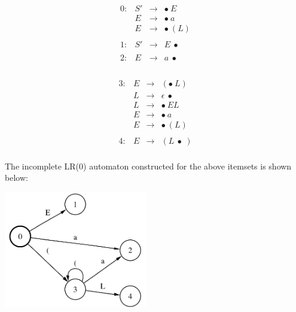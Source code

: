 \documentclass[12pt]{article}
\begin{document}
\begin{exe}
\begin{minipage}[t]{3in}
\[
\begin{array}{llcl}
0: & S' & \rightarrow & \bullet\ E \\
& E & \rightarrow & \bullet\ a \\
& E & \rightarrow & \bullet\ ( L ) \\
&&& \\
1: & S' & \rightarrow & E\ \bullet \\
&&& \\
2: & E & \rightarrow & a\ \bullet \\
&&& \\
\end{array}
\]
\end{minipage}
\begin{minipage}[t]{3in}
\[
\begin{array}{llcl}
3: & E & \rightarrow & ( \bullet\ L ) \\
& L  & \rightarrow & \epsilon\ \bullet\ \\
& L  & \rightarrow & \bullet\ E L \\
& E  & \rightarrow & \bullet\ a \\
& E  & \rightarrow & \bullet\ ( L ) \\
&&& \\
4: & E & \rightarrow & ( L\ \bullet\ ) \\
\end{array}
\]
\end{minipage}

The incomplete LR(0) automaton constructed for the above itemsets is shown below:
\begin{center}
\includegraphics[height=2in]{figures/quiz2-lr}
\end{center}


\end{exe}
\end{document}
